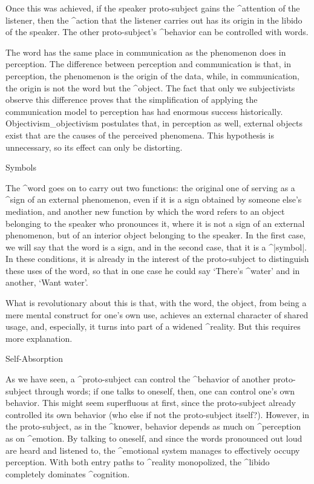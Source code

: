 Once this was achieved, if the speaker proto-subject gains the
^{attention} of the listener, then the ^{action} that the listener
carries out has its origin in the libido of the speaker. The other
proto-subject's ^{behavior} can be controlled with words.

The word has the same place in communication as the phenomenon does in
perception. The difference between perception and communication is that,
in perception, the phenomenon is the origin of the data, while, in
communication, the origin is not the word but the ^{object}. The fact
that only we subjectivists observe this difference proves that the
simplification of applying the communication model to perception has had
enormous success historically. Objectivism_{objectivism} postulates
that, in perception as well, external objects exist that are the causes
of the perceived phenomena. This hypothesis is unnecessary, so its
effect can only be distorting.


\Section Symbols

The ^{word} goes on to carry out two functions: the original one of
serving as a ^{sign} of an external phenomenon, even if it is a sign
obtained by someone else's mediation, and another new function by which
the word refers to an object belonging to the speaker who pronounces it,
where it is not a sign of an external phenomenon, but of an interior
object belonging to the speaker. In the first case, we will say that the
word is a sign, and in the second case, that it is a ^|symbol|. In these
conditions, it is already in the interest of the proto-subject to
distinguish these uses of the word, so that in one case he could say
`There's ^{water}' and in another, `Want water'.

What is revolutionary about this is that, with the word, the object,
from being a mere mental construct for one's own use, achieves an
external character of shared usage, and, especially, it turns into part
of a widened ^{reality}. But this requires more explanation.


\Section Self-Absorption

As we have seen, a ^{proto-subject} can control the ^{behavior} of
another proto-subject through words; if one talks to oneself, then, one
can control one's own behavior. This might seem superfluous at first,
since the proto-subject already controlled its own behavior (who else if
not the proto-subject itself?). However, in the proto-subject, as in the
^{knower}, behavior depends as much on ^{perception} as on ^{emotion}.
By talking to oneself, and since the words pronounced out loud are heard
and listened to, the ^{emotional system} manages to effectively occupy
perception. With both entry paths to ^{reality} monopolized, the
^{libido} completely dominates ^{cognition}.

